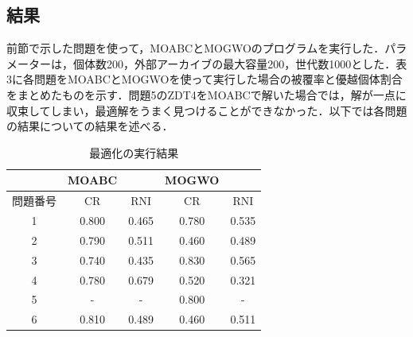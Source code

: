 \documentclass[a4paper, twocolumn]{ltjsarticle}
\begin{document}
\subsection{結果}
前節で示した問題を使って，MOABCとMOGWOのプログラムを実行した．パラメーターは，個体数200，外部アーカイブの最大容量200，世代数1000とした．表3に各問題をMOABCとMOGWOを使って実行した場合の被覆率と優越個体割合をまとめたものを示す．問題5のZDT4をMOABCで解いた場合では，解が一点に収束してしまい，最適解をうまく見つけることができなかった．以下では各問題の結果についての結果を述べる．
\begin{table}[b]
    \centering
    \caption{最適化の実行結果}
    \begin{tabular}{c|cc|cc}
        \hline
        & MOABC && MOGWO & \\
        \hline
        問題番号 & CR & RNI & CR & RNI\\\hline
        1 &0.800&0.465&0.780&0.535\\
        2 &0.790&0.511&0.460&0.489\\
        3 &0.740&0.435&0.830&0.565\\
        4 &0.780&0.679&0.520&0.321\\
        5 &-&-&0.800& -\\
        6 &0.810&0.489&0.460&0.511\\
        \hline
    \end{tabular}
\end{table}
\end{document}
